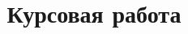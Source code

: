 \documentclass[utf8x]{G7-32} %
\title{Курсовая  работа}
\author{}
\begin{document}

\renewcommand{\labelenumi}{\arabic{enumi})}
\renewcommand{\labelenumii}{\asbuk{enumii})}


\frontmatter %





%
\pagestyle{plain}  



\tableofcontents







%


\mainmatter %







     
 

  
 
       





%
% 

%

\backmatter %



%


% 

% 
\end{document}
